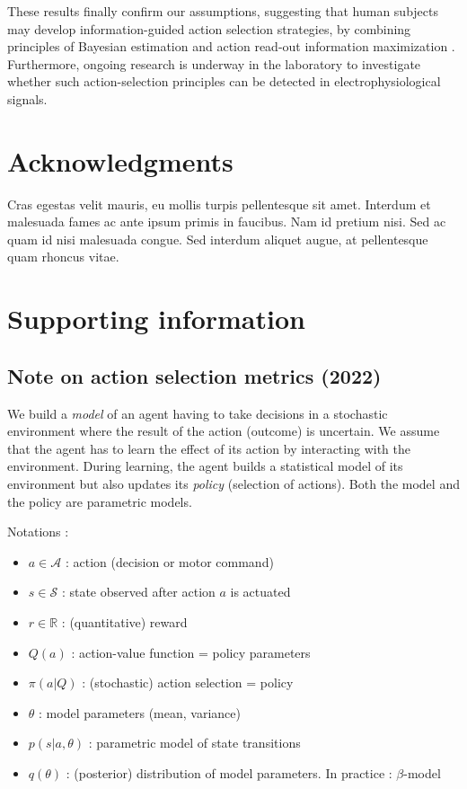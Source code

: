 \documentclass[10pt,letterpaper]{article}
\begin{document}
These results finally confirm our assumptions, suggesting that human subjects may develop information-guided action selection strategies, by combining principles of Bayesian estimation \cite{knill2004bayesian} and action read-out information maximization \cite{Klyubin2005EmpowermentAU}. Furthermore, ongoing research is underway in the laboratory to investigate whether such action-selection principles can be detected in electrophysiological signals.


\section*{Acknowledgments}
Cras egestas velit mauris, eu mollis turpis pellentesque sit amet. Interdum et malesuada fames ac ante ipsum primis in faucibus. Nam id pretium nisi. Sed ac quam id nisi malesuada congue. Sed interdum aliquet augue, at pellentesque quam rhoncus vitae.

\section*{Supporting information}

\subsection{Note on action selection metrics (2022)}

We build a \emph{model} of an agent having to take decisions in a stochastic environment where the result of the action (outcome) is uncertain.
We assume that the agent has to learn the effect of its action by interacting with the environment. During learning, the agent builds a statistical model of its environment but also updates its \emph{policy} (selection of actions). Both the model and the policy are parametric models. 

Notations :
\begin{itemize}
    \item $a \in \mathcal{A}$ : action (decision or motor command)
    \item $s \in \mathcal{S}$ : state observed after action $a$ is actuated
    \item $r \in \mathbb{R}$ : (quantitative) reward 
    \item $Q(a)$ : action-value function = policy parameters
    \item $\pi(a|Q)$ : (stochastic) action selection = policy
    \item $\theta$ : model parameters (mean, variance)
    \item $p(s|a, \theta)$ : parametric model of state transitions
    \item $q(\theta)$ : (posterior) distribution of model parameters. In practice : $\beta$-model 
\end{itemize}
\end{document}
